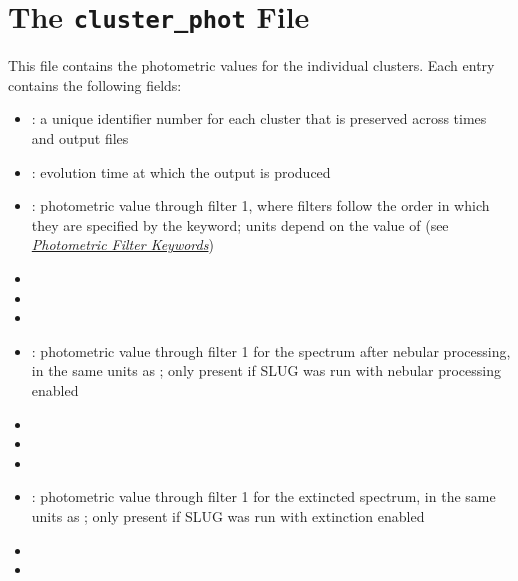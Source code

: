 \documentclass[letterpaper,10pt,english]{sphinxmanual}
\begin{document}
\section{The \texttt{cluster\_phot} File}
\label{output:the-cluster-phot-file}\label{output:ssec-cluster-phot-file}
This file contains the photometric values for the individual clusters. Each entry contains the following fields:
\begin{itemize}
\item {} 
: a unique identifier number for each cluster that is preserved across times and output files

\item {} 
: evolution time at which the output is produced

\item {} 
: photometric value through filter 1, where filters follow the order in which they are specified by the  keyword; units depend on the value of  (see {\hyperref[parameters:ssec-phot-keywords]{\emph{Photometric Filter Keywords}}})

\item {} 

\item {} 

\item {} 

\item {} 
: photometric value through filter 1 for the spectrum after nebular processing, in the same units as ; only present if SLUG was run with nebular processing enabled

\item {} 

\item {} 

\item {} 

\item {} 
: photometric value through filter 1 for the extincted spectrum, in the same units as ; only present if SLUG was run with extinction enabled

\item {} 

\item {} 


\end{itemize}
\end{document}
